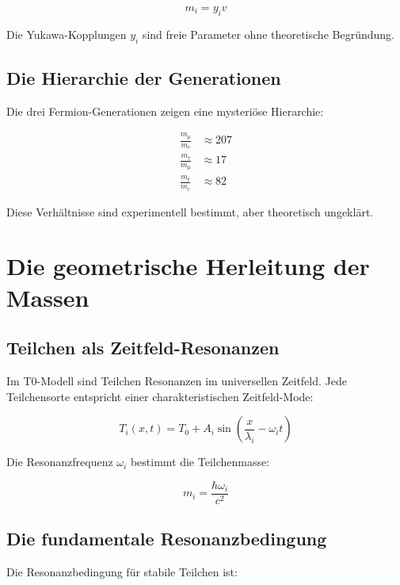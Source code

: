 \documentclass[12pt,a4paper]{report}
\begin{document}
	\begin{equation}
		m_i = y_i v
	\end{equation}
	
	Die Yukawa-Kopplungen $y_i$ sind freie Parameter ohne theoretische Begründung.
	
	\subsection{Die Hierarchie der Generationen}
	
	Die drei Fermion-Generationen zeigen eine mysteriöse Hierarchie:
	
	\begin{align}
		\frac{m_\mu}{m_e} &\approx 207 \\
		\frac{m_\tau}{m_\mu} &\approx 17 \\
		\frac{m_t}{m_c} &\approx 82
	\end{align}
	
	Diese Verhältnisse sind experimentell bestimmt, aber theoretisch ungeklärt.
	
	\section{Die geometrische Herleitung der Massen}
	
	\subsection{Teilchen als Zeitfeld-Resonanzen}
	
	Im T0-Modell sind Teilchen Resonanzen im universellen Zeitfeld. Jede Teilchensorte entspricht einer charakteristischen Zeitfeld-Mode:
	
	\begin{equation}
		T_i(x,t) = T_0 + A_i \sin\left(\frac{x}{\lambda_i} - \omega_i t\right)
	\end{equation}
	
	Die Resonanzfrequenz $\omega_i$ bestimmt die Teilchenmasse:
	
	\begin{equation}
		m_i = \frac{\hbar\omega_i}{c^2}
	\end{equation}
	
	\subsection{Die fundamentale Resonanzbedingung}
	
	Die Resonanzbedingung für stabile Teilchen ist:
	
\end{document}
